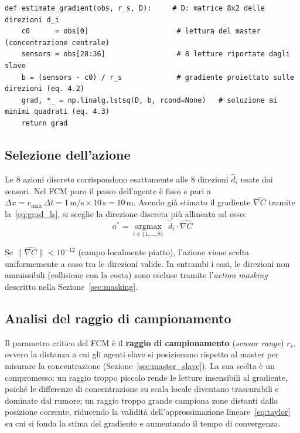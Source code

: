 \begin{lstlisting}
def estimate_gradient(obs, r_s, D):     # D: matrice 8x2 delle direzioni d_i
    c0      = obs[0]                     # lettura del master (concentrazione centrale)
    sensors = obs[28:36]                 # 8 letture riportate dagli slave
    b = (sensors - c0) / r_s             # gradiente proiettato sulle direzioni (eq. 4.2)
    grad, *_ = np.linalg.lstsq(D, b, rcond=None)   # soluzione ai minimi quadrati (eq. 4.3)
    return grad
\end{lstlisting}

\subsection{Selezione dell'azione}
\label{sec:azione_fcm}

Le 8 azioni discrete corrispondono esattamente alle 8 direzioni $\hat{d}_i$ usate
dai sensori. Nel FCM puro il passo dell'agente \`e fisso e pari a
$\Delta x = v_{\max}\,\Delta t = 1\,\text{m/s}\times 10\,\text{s} = 10\,\text{m}$.
Avendo gi\`a stimato il gradiente $\hat{\nabla C}$ tramite la~\eqref{eq:grad_ls}, si
sceglie la direzione discreta pi\`u allineata ad esso:
\begin{equation}
    a^* = \operatorname*{argmax}_{i \in \{1,\ldots,8\}} \; \hat{d}_i \cdot \hat{\nabla C}
    \label{eq:argmax_fcm}
\end{equation}

Se $\|\hat{\nabla C}\| < 10^{-12}$ (campo localmente piatto), l'azione viene scelta
uniformemente a caso tra le direzioni valide. In entrambi i casi, le direzioni non
ammissibili (collisione con la costa) sono escluse tramite l'\emph{action masking}
descritto nella Sezione~\ref{sec:masking}.

\subsection{Analisi del raggio di campionamento}
\label{sec:sensor_range}

Il parametro critico del FCM \`e il \textbf{raggio di campionamento} (\emph{sensor
range}) $r_s$, ovvero la distanza a cui gli agenti slave si posizionano rispetto al
master per misurare la concentrazione (Sezione~\ref{sec:master_slave}). La sua scelta
\`e un compromesso: un raggio troppo piccolo rende le letture insensibili al gradiente,
poich\'e le differenze di concentrazione su scala locale diventano trascurabili e
dominate dal rumore; un raggio troppo grande campiona zone distanti dalla posizione
corrente, riducendo la validit\`a dell'approssimazione lineare~\eqref{eq:taylor} su cui
si fonda la stima del gradiente e aumentando il tempo di convergenza.


